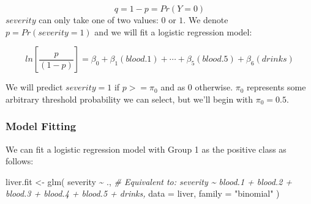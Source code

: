 \documentclass[
  11pt,
  a4paper,
]{scrartcl}
\newenvironment{Shaded}{\begin{snugshade}}{\end{snugshade}}
\newcommand{\AttributeTok}[1]{\textcolor[rgb]{0.77,0.63,0.00}{#1}}
\newcommand{\CommentTok}[1]{\textcolor[rgb]{0.56,0.35,0.01}{\textit{#1}}}
\newcommand{\FunctionTok}[1]{\textcolor[rgb]{0.00,0.00,0.00}{#1}}
\newcommand{\NormalTok}[1]{#1}
\newcommand{\OtherTok}[1]{\textcolor[rgb]{0.56,0.35,0.01}{#1}}
\newcommand{\SpecialCharTok}[1]{\textcolor[rgb]{0.00,0.00,0.00}{#1}}
\newcommand{\StringTok}[1]{\textcolor[rgb]{0.31,0.60,0.02}{#1}}
\begin{document}
\[
q = 1 - p = Pr(Y = 0)
\] \(severity\) can only take one of two values: \(0\) or \(1\). We
denote \(p = Pr(severity = 1)\) and we will fit a logistic regression
model:

\[
ln[\frac{p}{(1-p)}] = \beta_0 + \beta_1(blood.1) + \cdots + \beta_5(blood.5) + \beta_6(drinks)
\]

We will predict \(severity = 1\) if \(p >= \pi_0\) and as \(0\)
otherwise. \(\pi_0\) represents some arbitrary threshold probability we
can select, but we'll begin with \(\pi_0 = 0.5\).

\hypertarget{model-fitting}{%
\subsubsection{Model Fitting}\label{model-fitting}}

We can fit a logistic regression model with Group 1 as the positive
class as follows:

\begin{Shaded}
\begin{Highlighting}[]
\NormalTok{liver.fit }\OtherTok{\textless{}{-}} \FunctionTok{glm}\NormalTok{(}
\NormalTok{  severity }\SpecialCharTok{\textasciitilde{}}\NormalTok{ .,}
  \CommentTok{\# Equivalent to:  severity \textasciitilde{} blood.1 + blood.2 + blood.3 + blood.4 + blood.5 + drinks, }
  \AttributeTok{data =}\NormalTok{ liver,}
  \AttributeTok{family =} \StringTok{"binomial"}
\NormalTok{)}
\end{Highlighting}
\end{Shaded}
\end{document}
